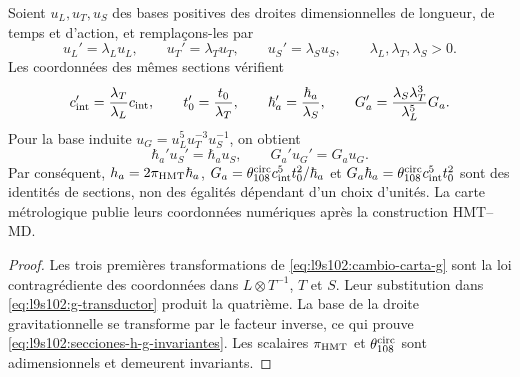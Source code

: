 \begin{theorem}
\label{thm:l9s102:covariancia-unidades-g}
Soient \(u_L,u_T,u_S\) des bases positives des droites dimensionnelles de
longueur, de temps et d'action, et remplaçons-les par
\[
 u_L'=\lambda_Lu_L,\qquad
 u_T'=\lambda_Tu_T,\qquad
 u_S'=\lambda_Su_S,
 \qquad \lambda_L,\lambda_T,\lambda_S>0.
\]
Les coordonnées des mêmes sections vérifient
\begin{equation}
 c_{\rm int}'=\frac{\lambda_T}{\lambda_L}c_{\rm int},\qquad
 t_0'=\frac{t_0}{\lambda_T},\qquad
 \hbar_a'=\frac{\hbar_a}{\lambda_S},\qquad
 G_a'=\frac{\lambda_S\lambda_T^3}{\lambda_L^5}G_a.
 \label{eq:l9s102:cambio-carta-g}
\end{equation}
Pour la base induite
\(u_G=u_L^5u_T^{-3}u_S^{-1}\), on obtient
\begin{equation}
 \hbar_a'u_S'=\hbar_au_S,
 \qquad G_a'u_G'=G_au_G.
 \label{eq:l9s102:secciones-h-g-invariantes}
\end{equation}
Par conséquent,
\(h_a=2\pi_{\rm HMT}\hbar_a\),
\(G_a=\theta_{108}^{\rm circ}c_{\rm int}^5t_0^2/\hbar_a\) et
\(G_a\hbar_a=\theta_{108}^{\rm circ}c_{\rm int}^5t_0^2\)
sont des identités de sections, non des égalités dépendant d'un choix
d'unités. La carte métrologique publie leurs coordonnées numériques après
la construction HMT--MD.
\end{theorem}

\begin{proof}
Les trois premières transformations de
\eqref{eq:l9s102:cambio-carta-g} sont la loi contragrédiente des coordonnées
dans \(L\otimes T^{-1}\), \(T\) et \(S\). Leur substitution dans
\eqref{eq:l9s102:g-transductor} produit la quatrième. La base de la droite
gravitationnelle se transforme par le facteur inverse, ce qui prouve
\eqref{eq:l9s102:secciones-h-g-invariantes}. Les scalaires
\(\pi_{\rm HMT}\) et \(\theta_{108}^{\rm circ}\) sont adimensionnels et
demeurent invariants.
\end{proof}
